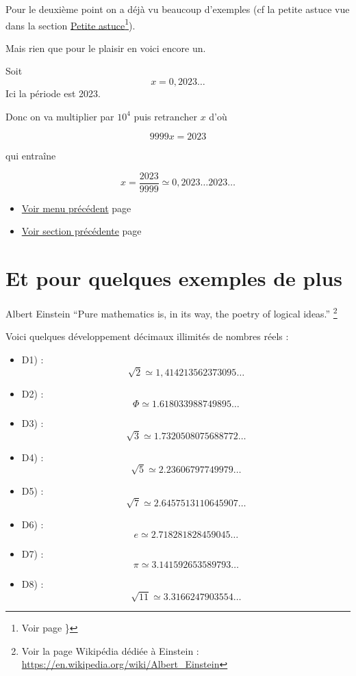 \documentclass[a4paper,11pt]{book}
\begin{document}
Pour le deuxième point on a déjà vu beaucoup d'exemples (cf la
petite astuce vue dans la section \hyperref[org36b98de]{Petite astuce}\footnote{Voir page \pageref{page:sec2.6.3tip}\}}).



Mais rien que pour le plaisir en voici encore un.

Soit \[x = 0,2023\dots\]
Ici la période est 2023.

Donc on va multiplier par \(10^4\) puis retrancher \(x\) d'où

\[9999x = 2023\]

qui entraîne

\[x = \dfrac{2023}{9999} \simeq 0,2023\dots 2023\dots\]



\begin{itemize}
\item \hyperref[org82a5705]{Voir menu précédent}
page~\pageref{page:deeps-menu}
\item \hyperref[org1e7ea68]{Voir section précédente}
page~\pageref{page:sec6.1review}
\end{itemize}



\clearpage

\chapter{Et pour quelques exemples de plus}
\label{sec:org54329ff}
\label{orgde7e38b}
\label{page:sec6.3exs}

\begin{myquote}{Albert Einstein}
\enquote{Pure mathematics is, in its way, the poetry of logical ideas.}
\footnote{Voir la page Wikipédia dédiée à Einstein : \url{https://en.wikipedia.org/wiki/Albert_Einstein}}
\end{myquote}



\clearpage

Voici quelques développement décimaux illimités de
nombres réels :



\begin{itemize}
\item D1) : \[\sqrt{2} \simeq 1,414213562373095\dots\]
\item D2) : \[\Phi \simeq 1.618033988749895\dots\]
\item D3) : \[\sqrt{3} \simeq 1.7320508075688772\dots\]
\item D4) : \[\sqrt{5} \simeq 2.23606797749979\dots\]
\item D5) : \[\sqrt{7} \simeq 2.6457513110645907\dots\]
\item D6) : \[e \simeq 2.718281828459045\dots\]
\item D7) : \[\pi \simeq 3.141592653589793\dots\]
\item D8) : \[\sqrt{11} \simeq 3.3166247903554\dots\]
\end{itemize}
\end{document}
